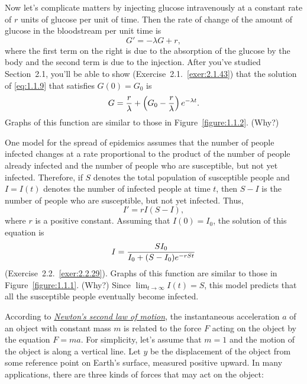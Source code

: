 \documentclass{ximera}
\begin{document}
Now let's complicate matters by injecting glucose intravenously
at a constant rate of $r$ units of glucose per unit of time.
Then the rate of change of the amount of glucose  in the bloodstream
per unit time is
\begin{equation} \label{eq:1.1.9}
G'=-\lambda G+r,
\end{equation}
where the first term on the right is due to the absorption of the
glucose by the body and the second term is due to the injection.
 After you've studied Section~2.1,
you'll be able to show (Exercise~2.1.~\hspace*{-3pt}\ref{exer:2.1.43}) that the solution
of
\eqref{eq:1.1.9} that satisfies $G(0)=G_0$ is
$$
G={r\over\lambda}+\left(G_0-{r\over\lambda}\right)e^{-\lambda t}.
$$
Graphs of  this function are similar to those in
Figure~\ref{figure:1.1.2}.
(Why?)


\noindent
One model for the spread of epidemics assumes that the number of
people infected changes at a rate proportional to the product of the
number of people already infected and the number of people who are
susceptible, but not yet infected. Therefore, if $S$ denotes the
total population of susceptible people and $I=I(t)$ denotes the
number
of infected people at time $t$, then $S-I$ is the number of people
who are susceptible, but not yet infected. Thus,
$$
I'=rI(S-I),
$$
where $r$ is a positive constant. Assuming that $I(0)=I_0$,
the solution of this equation is
$$
I={SI_0\over I_0+(S-I_0)e^{-rSt}}
$$
(Exercise~2.2.~\hspace*{-3pt}\ref{exer:2.2.29}).
 Graphs of this function are similar to those in
Figure~\ref{figure:1.1.1}.
(Why?)
Since $\lim_{t\to\infty}I(t)=S$, this model predicts that all the
susceptible people eventually become infected.


\noindent

According to
\href{http://www-history.mcs.st-and.ac.uk/Mathematicians/Newton.html}
{\color{blue}\it Newton's second law of motion},  the
instantaneous acceleration
$a$ of an object with constant mass $m$ is related to the force $F$
acting on the object by the equation $F=ma$. For simplicity, let's
assume that $m=1$ and the motion of the object is along a vertical
line. Let $y$ be the displacement of the object from some reference
point on Earth's surface, measured positive upward. In many
applications, there are three kinds of forces that may act on the
object:
\end{document}
